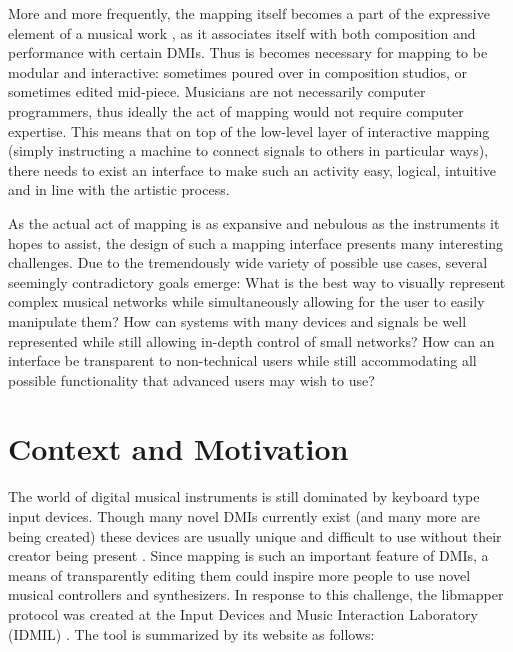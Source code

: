 More and more frequently, the mapping itself becomes a part of the expressive element of a musical work ,
as it associates itself with both composition and performance with certain DMIs. Thus is becomes necessary for mapping to be modular and interactive: sometimes poured over in composition studios, or sometimes edited mid-piece. Musicians are not necessarily computer programmers, thus ideally the act of mapping would not require computer expertise. This means that on top of the low-level layer of interactive mapping (simply instructing a machine to connect signals to others in particular ways), there needs to exist an interface to make such an activity easy, logical, intuitive and in line with the artistic process.

As the actual act of mapping is as expansive and nebulous as the instruments it hopes to assist, the design of such a mapping interface presents many interesting challenges. Due to the tremendously wide variety of possible use cases, several seemingly contradictory goals emerge: What is the best way to visually represent complex musical networks while simultaneously allowing for the user to easily manipulate them? How can systems with many devices and signals be well represented while still allowing in-depth control of small networks? How can an interface be transparent to non-technical users while still accommodating all possible functionality that advanced users may wish to use? 


\section{Context and Motivation}

The world of digital musical instruments is still dominated by keyboard type input devices. Though many novel DMIs currently exist (and many more are being created) these devices are usually unique and difficult to use without their creator being present \cite{squeezevox}.
Since mapping is such an important feature of DMIs, a means of transparently editing them could inspire more people to use novel musical controllers and synthesizers. In response to this challenge, the libmapper protocol was created at the Input Devices and Music Interaction Laboratory (IDMIL) . The tool is summarized by its website as follows:

